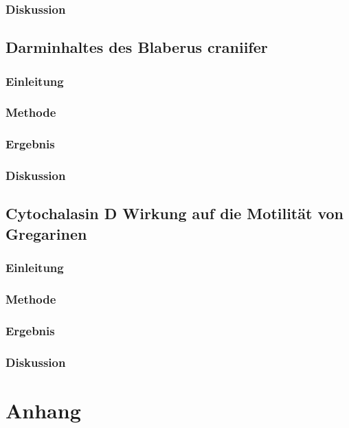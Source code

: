\documentclass[oneside,10pt,a4paper]{report}
\begin{document}
			\subsection{Diskussion}
	
		\section{Darminhaltes des Blaberus craniifer}
			\subsection{Einleitung}
			\subsection{Methode}
			\subsection{Ergebnis}
			\subsection{Diskussion}
		
		\section{Cytochalasin D Wirkung auf die Motilität von Gregarinen}
			\subsection{Einleitung}
			\subsection{Methode}
			\subsection{Ergebnis}
			\subsection{Diskussion}
			
	
	
	\chapter{Anhang}
\end{document}
